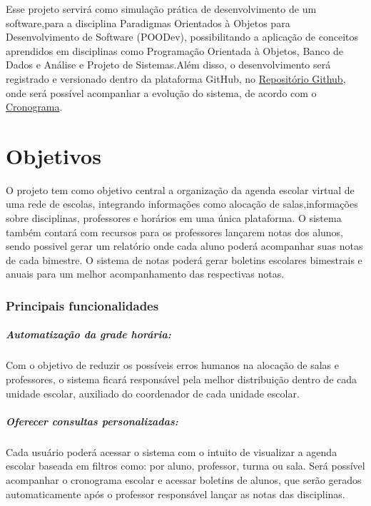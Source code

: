 \documentclass[12pt,a4paper]{report}
\begin{document}
Esse projeto servirá como simulação prática de desenvolvimento de um software,para a disciplina Paradigmas Orientados à Objetos para Desenvolvimento de Software (POODev), possibilitando a aplicação de conceitos aprendidos em disciplinas como Programação Orientada à Objetos, Banco de Dados e Análise e Projeto de Sistemas.Além disso, o desenvolvimento será registrado e versionado dentro da plataforma GitHub, no \href{https://github.com/DaviRodrish/Projeto-PooDev---Agenda-Escolar}{Repositório Github}, onde será possível acompanhar a evolução do sistema, de acordo com o \hyperref[sec:cronograma]{Cronograma}.


\chapter{Objetivos}
O projeto tem como objetivo central a organização da agenda escolar virtual de uma rede de escolas, integrando informações como alocação de salas,informações sobre disciplinas, professores e horários em uma única plataforma. O sistema também contará com recursos para os professores lançarem notas dos alunos, sendo possivel gerar um relatório onde cada aluno poderá acompanhar suas notas de cada bimestre. O sistema de notas poderá gerar boletins escolares bimestrais e anuais para um melhor acompanhamento das respectivas notas. 

\subsection*{Principais funcionalidades}
	\paragraph{Automatização da grade horária:}Com o objetivo de reduzir os possíveis erros humanos na alocação de salas e professores, o sistema ficará responsável pela melhor distribuição dentro de cada unidade escolar, auxiliado do coordenador de cada unidade escolar.
	\paragraph{Oferecer consultas personalizadas:} Cada usuário poderá acessar o sistema com o intuito de visualizar a agenda escolar baseada em filtros como: por aluno, professor, turma ou sala. Será possível acompanhar o cronograma escolar e acessar boletins de alunos, que serão gerados automaticamente após o professor responsável lançar as notas das disciplinas.
\end{document}
